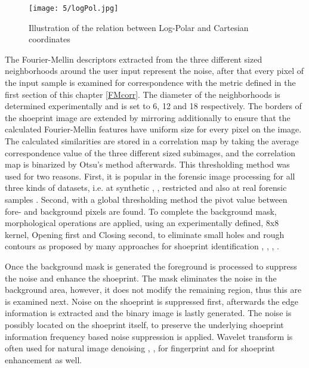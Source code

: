 \documentclass[draft,final]{vutinfth} %
\begin{document}
\begin{figure}[h]
  \centering
  \texttt{[image: 5/logPol.jpg]}
  \caption{Illustration of the relation between Log-Polar and Cartesian coordinates \cite{sarvaiya2012image}}
  \label{fig:sans:logPol} %
\end{figure}

\par
The Fourier-Mellin descriptors extracted from the three different sized neighborhoods around the user input represent the noise, after that every pixel of the input sample is examined for correspondence with the metric defined in the first section of this chapter \ref{FMcorr}.
The diameter of the neighborhoods is determined experimentally and is set to 6, 12 and 18 respectively.
The borders of the shoeprint image are extended by mirroring additionally to ensure that the calculated Fourier-Mellin features have uniform size for every pixel on the image.
The calculated similarities are stored in a correlation map by taking the average correspondence value of the three different sized subimages, and the correlation map is binarized by Otsu's method afterwards.
This thresholding method was used for two reasons.
First, it is popular in the forensic image processing for all three kinds of datasets, i.e. at synthetic \cite{algarni2008novel}, \cite{alizadeh2017automatic}, restricted \cite{kong2014novel} and also at real forensic samples \cite{wu2019crime}.
Second, with a global thresholding method the pivot value between fore- and background pixels are found.
To complete the background mask, morphological operations are applied, using an experimentally defined, 8x8 kernel, Opening first and Closing second, to eliminate small holes and rough contours as proposed by many approaches for shoeprint identification \cite{wang2014automatic}, \cite{kong2014novel}, \cite{li2014retrieval}, \cite{tang2010footwear}.
\par
Once the background mask is generated the foreground is processed to suppress the noise and enhance the shoeprint.
The mask eliminates the noise in the background area, however, it does not modify the remaining region, thus this are is examined next.
Noise on the shoeprint is suppressed first, afterwards the edge information is extracted and the binary image is lastly generated.
The noise is possibly located on the shoeprint itself, to preserve the underlying shoeprint information frequency based noise suppression is applied.
Wavelet transform is often used for natural image denoising \cite{xu2016image}, \cite{sugamya2016image}, for fingerprint \cite{li2012texture} and for shoeprint enhancement \cite{katireddy2017novel} as well.
\end{document}
